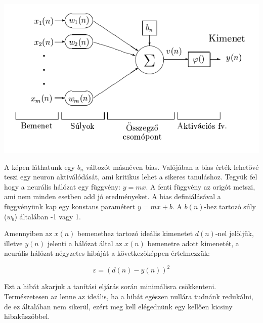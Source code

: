 \begin{center}
	\includegraphics[scale=0.6]{images/ANNParts.png}
\end{center}

A képen láthatunk egy \(b_n\) változót másnéven bias. Valójában a bias érték lehetővé teszi egy neuron aktiválódását, ami kritikus lehet a sikeres tanuláshoz. Tegyük fel hogy a neurális hálózat egy függvény: \(y = mx\). A fenti függvény az origót metszi, ami nem minden esetben add jó eredményeket. A bias definiálásával a függvényünk kap egy konstans paramétert \(y = mx + b\). A \(b(n)\)-hez tartozó súly (\(w_b\)) általában -1 vagy 1.

Amennyiben az \(x(n)\) bemenethez tartozó ideális kimenetet \(d(n)\)-nel jelöljük, illetve \(y(n)\) jelenti a hálózat által az \(x(n)\) bemenetre adott kimenetét, a neurális hálózat négyzetes hibáját a következőképpen értelmezzük:

\[ \varepsilon = (d(n) - y(n))^2\]

Ezt a hibát akarjuk a tanítási eljárás során minimálisra csökkenteni. Természetesen az lenne az ideális, ha a hibát egészen nullára tudnánk redukálni, de ez általában nem sikerül, ezért meg kell elégednünk egy kellően kicsiny hibaküszöbbel.


